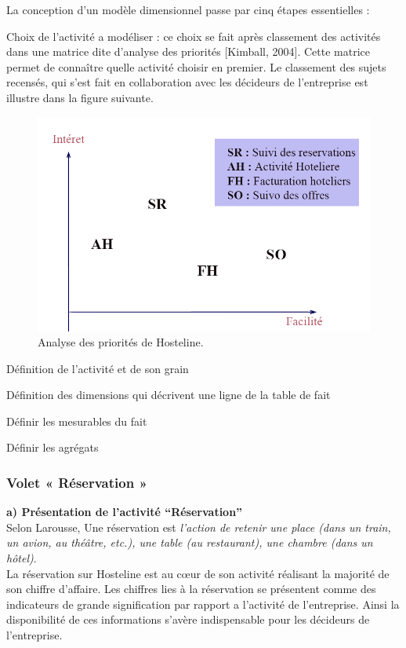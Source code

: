  La conception d’un modèle dimensionnel passe par cinq étapes essentielles :
 \begin{list}{•}{ }
    \item Choix de l’activité a modéliser : ce choix se fait après classement des activités dans une matrice dite d’analyse des priorités [Kimball, 2004]. Cette matrice permet de connaître quelle activité choisir en premier. Le classement des sujets recensés, qui s’est fait en collaboration avec les décideurs de l’entreprise est illustre dans la figure suivante.
    \begin{figure}[!htbp]
	\begin{center}
		\includegraphics[scale=0.40]{images/priority.png}
		\caption{Analyse des priorités de Hosteline.}
		\label{use_bi_tools}
	\end{center}
	\end{figure}
    \item Définition de l’activité et de son grain
	\item Définition des dimensions qui décrivent une ligne de la table de fait
	\item Définir les mesurables du fait
    \item Définir les agrégats 
    
 \end{list}
 

\subsubsection{Volet « Réservation »}

\textbf{a)	Présentation de l’activité “Réservation”}\\
Selon Larousse, Une réservation est  \textit{l’action de retenir une place (dans un train, un avion, au théâtre, etc.), une table (au restaurant), une chambre (dans un hôtel)}.\\
La réservation sur Hosteline est au cœur de son activité réalisant la majorité de son chiffre d’affaire. Les chiffres lies à la réservation se présentent comme des indicateurs de grande signification par rapport a l’activité de l’entreprise. Ainsi la disponibilité de ces informations s’avère indispensable pour les décideurs de l’entreprise.\\

